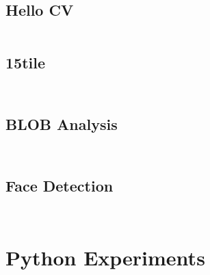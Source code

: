 \subsection{Hello CV}
	\inputminted[breaklines,
					linenos,
					frame=lines,
					fontsize=\footnotesize]{java}{../code/android/hello_cv/MainActivity.java}
	\subsection{15tile}
	\inputminted[breaklines,
					linenos,
					frame=lines,
					fontsize=\footnotesize]{java}{../code/android/15tile/MainActivity.java}
	\inputminted[breaklines,
					linenos,
					frame=lines,
					fontsize=\footnotesize]{java}{../code/android/15tile/PuzzleProcessor.java}
	\subsection{BLOB Analysis}
	\inputminted[breaklines,
					linenos,
					frame=lines,
					fontsize=\footnotesize]{java}{../code/android/blob_analysis/ColorBlobDetectionActivity.java}
	\inputminted[breaklines,
					linenos,
					frame=lines,
					fontsize=\footnotesize]{java}{../code/android/blob_analysis/ColorBlobDetector.java}
	\subsection{Face Detection}
	\inputminted[breaklines,
					linenos,
					frame=lines,
					fontsize=\footnotesize]{java}{../code/android/face_recognition/DetectionBasedTracker.java}
	\inputminted[breaklines,
					linenos,
					frame=lines,
					fontsize=\footnotesize]{java}{../code/android/face_recognition/FrActivity.java}
\clearpage
\section{Python Experiments}\label{app:python_experiments}
